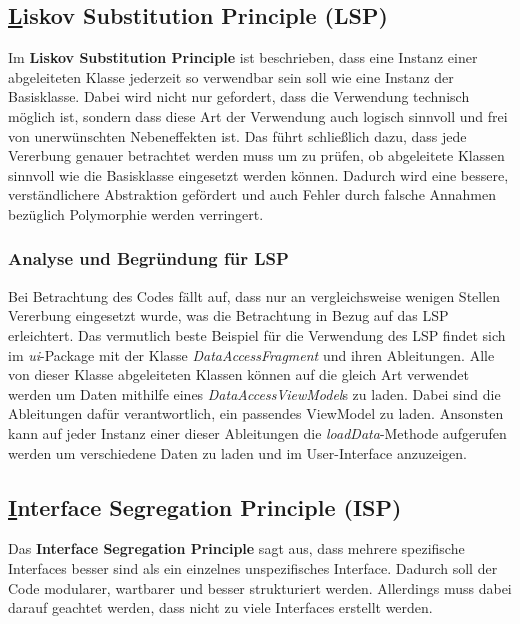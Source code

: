 \documentclass[12pt]{article}
\begin{document}
\newpage
\subsection{\underline{L}iskov Substitution Principle (LSP)}

Im \textbf{Liskov Substitution Principle} ist beschrieben, dass eine Instanz einer abgeleiteten Klasse jederzeit so verwendbar sein soll wie eine Instanz der Basisklasse.
Dabei wird nicht nur gefordert, dass die Verwendung technisch möglich ist, sondern dass diese Art der Verwendung auch logisch sinnvoll und frei von unerwünschten Nebeneffekten ist.
Das führt schließlich dazu, dass jede Vererbung genauer betrachtet werden muss um zu prüfen, ob abgeleitete Klassen sinnvoll wie die Basisklasse eingesetzt werden können.
Dadurch wird eine bessere, verständlichere Abstraktion gefördert und auch Fehler durch falsche Annahmen bezüglich Polymorphie werden verringert.

\subsubsection{Analyse und Begründung für LSP}
Bei Betrachtung des Codes fällt auf, dass nur an vergleichsweise wenigen Stellen Vererbung eingesetzt wurde, was die Betrachtung in Bezug auf das LSP erleichtert.
Das vermutlich beste Beispiel für die Verwendung des LSP findet sich im \textit{ui}-Package mit der Klasse \textit{DataAccessFragment} und ihren Ableitungen.
Alle von dieser Klasse abgeleiteten Klassen können auf die gleich Art verwendet werden um Daten mithilfe eines \textit{DataAccessViewModel}s zu laden.
Dabei sind die Ableitungen dafür verantwortlich, ein passendes ViewModel zu laden.
Ansonsten kann auf jeder Instanz einer dieser Ableitungen die \textit{loadData}-Methode aufgerufen werden um verschiedene Daten zu laden und im User-Interface anzuzeigen.


\newpage
\subsection{\underline{I}nterface Segregation Principle (ISP)}

Das \textbf{Interface Segregation Principle} sagt aus, dass mehrere spezifische Interfaces besser sind als ein einzelnes unspezifisches Interface.
Dadurch soll der Code modularer, wartbarer und besser strukturiert werden. 
Allerdings muss dabei darauf geachtet werden, dass nicht zu viele Interfaces erstellt werden.
\end{document}
